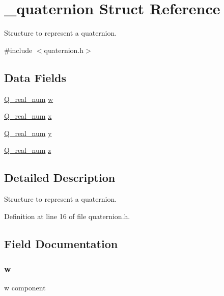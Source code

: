 \hypertarget{struct__quaternion}{
\section{\_\-quaternion Struct Reference}
\label{struct__quaternion}
}


Structure to represent a quaternion.  




{\ttfamily \#include $<$quaternion.h$>$}

\subsection*{Data Fields}
\begin{DoxyCompactItemize}
\item 
\hyperlink{quaternion_8h_aa8cdcb80e202a7e3d1a2106c45a17cd0}{Q\_\-real\_\-num} \hyperlink{struct__quaternion_a422bc167d29e94c39a595b17626d9897}{w}
\item 
\hyperlink{quaternion_8h_aa8cdcb80e202a7e3d1a2106c45a17cd0}{Q\_\-real\_\-num} \hyperlink{struct__quaternion_a57feec2241004ce8ef4d3bd23dbca8a4}{x}
\item 
\hyperlink{quaternion_8h_aa8cdcb80e202a7e3d1a2106c45a17cd0}{Q\_\-real\_\-num} \hyperlink{struct__quaternion_ae436ba8801f1bf67b94d3f48c6299456}{y}
\item 
\hyperlink{quaternion_8h_aa8cdcb80e202a7e3d1a2106c45a17cd0}{Q\_\-real\_\-num} \hyperlink{struct__quaternion_a6aad713ac1638c36d58a7f84e28f9bf0}{z}
\end{DoxyCompactItemize}


\subsection{Detailed Description}
Structure to represent a quaternion. 

Definition at line 16 of file quaternion.h.



\subsection{Field Documentation}
\hypertarget{struct__quaternion_a422bc167d29e94c39a595b17626d9897}{
\subsubsection[{w}]{ {\bf w}}}
\label{struct__quaternion_a422bc167d29e94c39a595b17626d9897}
w component 

